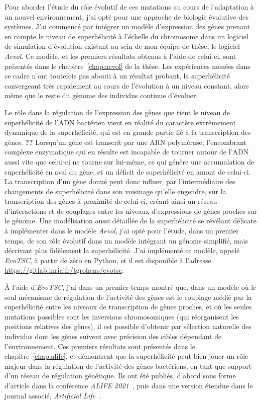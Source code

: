 Pour aborder l'étude du rôle évolutif de ces mutations au cours de l'adaptation à un nouvel environnement, j'ai opté pour une approche de biologie évolutive des systèmes.
J'ai commencé par intégrer un modèle d'expression des gènes prenant en compte le niveau de superhélicité à l'échelle du chromosome dans un logiciel de simulation d'évolution existant au sein de mon équipe de thèse, le logiciel \emph{Aevol}.
Ce modèle, et les premiers résultats obtenus à l'aide de celui-ci, sont présentés dans le chapitre~\ref{chap:aevol} de la thèse.
Les expériences menées dans ce cadre n'ont toutefois pas abouti à un résultat probant, la superhélicité convergeant très rapidement au cours de l'évolution à un niveau constant, alors même que le reste du génome des individus continue d'évoluer.

Le rôle dans la régulation de l'expression des gènes que tient le niveau de superhélicité de l'ADN bactérien vient en réalité du caractère extrêmement dynamique de la superhélicité, qui est en grande partie lié à la transcription des gènes. \textbf{??}
Lorsqu'un gène est transcrit par une ARN polymérase, l'encombrant complexe enzymatique qui en résulte est incapable de tourner autour de l'ADN aussi vite que celui-ci ne tourne sur lui-même, ce qui génère une accumulation de superhélicité en aval du gène, et un déficit de superhélicité en amont de celui-ci.
La transcription d'un gène donné peut donc influer, par l'intermédiaire des changements de superhélicité dans son voisinage qu'elle engendre, sur la transcription des gènes à proximité de celui-ci, créant ainsi un réseau d'interactions et de couplages entre les niveaux d'expressions de gènes proches sur le génome.
Une modélisation aussi détaillée de la superhélicité se révélant délicate à implémenter dans le modèle \emph{Aevol}, j'ai opté pour l'étude, dans un premier temps, de son rôle évolutif dans un modèle intégrant un génome simplifié, mais décrivant plus fidèlement la superhélicité.
J'ai implémenté ce modèle, appelé \emph{EvoTSC}, à partir de zéro en Python, et il est disponible à l'adresse \url{https://gitlab.inria.fr/tgrohens/evotsc}.

À l'aide d'\emph{EvoTSC}, j'ai dans un premier temps montré que, dans un modèle où le seul mécanisme de régulation de l'activité des gènes est le couplage médié par la superhélicité entre les niveaux de transcription de gènes proches, et où les seules mutations possibles sont les inversions chromosomiques (qui réorganisent les positions relatives des gènes), il est possible d'obtenir par sélection naturelle des individus dont les gènes suivent avec précision des cibles dépendant de l'environnement.
Ces premiers résultats sont présentés dans le chapitre~\ref{chap:alife}, et démontrent que la superhélicité peut bien jouer un rôle majeur dans la régulation de l'activité des gènes bactériens, en tant que support d'un réseau de régulation génétique.
Ils ont été publiés, d'abord sous forme d'article dans la conférence \emph{ALIFE 2021}~\citep{grohens2021}, puis dans une version étendue dans le journal associé, \emph{Artificial Life}~\citep{grohens2022a}.

